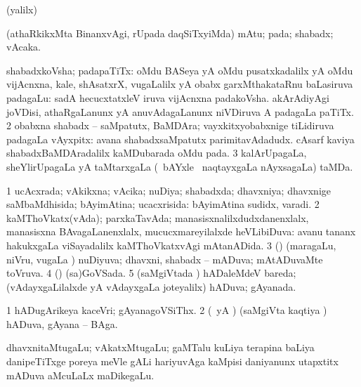 \bentry
{}
\gl{\saMkiSx}
\expl{}
\bmng
 (\UK yalilx) 
\emng
\eentry

\bentry
{} 
\gl{\nA}
\expl{}
\bmng
 (athaRkikxMta BinanxvAgi, rUpada daqSiTxyiMda) mAtu; pada; shabadx; vAcaka. 
\emng
\eentry

\bentry 
{} 
\gl{\nA}
\bmng
\bnum
{} shabadxkoVsha; padapaTiTx: 
\banum
{} oMdu BASeya yA oMdu pusatxkadalilx yA oMdu vijAcnxna, kale, shAsatxrX, \mo vugaLalilx yA obabx garxMthakataRnu baLasiruva padagaLu:  sadA hecucxtatxleV iruva vijAcnxna padakoVsha. 
 akArAdiyAgi joVDisi, athaRgaLanunx yA anuvAdagaLanunx niVDiruva A padagaLa paTiTx. 
\eanum
\numie
\num{2} obabxna shabadx -- saMpatutx, BaMDAra; vayxkitxyobabxnige tiLidiruva padagaLa vAyxpitx:  avana shabadxsaMpatutx parimitavAdadudx.  cAsarf kaviya shabadxBaMDAradalilx kaMDubarada oMdu pada. 
\num{3} kalArUpagaLa, sheYlirUpagaLa yA taMtarxgaLa (\kanmu\ bAYxle \mo\ naqtayxgaLa nAyxsagaLa) taMDa. 
\enum
\emng
\eentry

\bentry
{} 
\gl{\gu}
\expl{}
\bmng
\bnum
\num{1} ucAcxrada; vAkikxna; vAcika; nuDiya; shabadxda; dhavxniya; dhavxnige saMbaMdhisida; bAyimAtina; ucacxrisida:  bAyimAtina sudidx, varadi. 
\num{2} kaMThoVkatx(vAda); parxkaTavAda; manasisxnalilxdudxdanenxlalx, manasisxna BAvagaLanenxlalx, mucucxmareyilalxde heVLibiDuva:  avanu tananx hakukxgaLa viSayadalilx kaMThoVkatxvAgi mAtanADida. 
\num{3} (\kAparx) (maragaLu, niVru, \mo vugaLa \vi) nuDiyuva; dhavxni, shabadx -- mADuva; mAtADuvaMte toVruva. 
\num{4} (\dhavxni) (sa)GoVSada. 
\num{5} (saMgiVtada \vi) hADaleMdeV bareda; (vAdayxgaLilalxde yA vAdayxgaLa joteyalilx) hADuva; gAyanada. 
\enum
\emng
\eentry

\bentry
{} 
\gl{\nA}
\expl{}
\bmng
\bnum
\num{1} hADugArikeya kaceVri; gAyanagoVSiThx. 
\num{2} (\Eva\ yA \bava) (saMgiVta kaqtiya \vi) hADuva, gAyana -- BAga. 
\enum
\emng
\eentry

\bentry 
{} 
\gl{\nA}
\expl{}
\bmng
 dhavxnitaMtugaLu; vAkatxMtugaLu; gaMTalu kuLiya terapina baLiya danipeTiTxge poreya meVle gALi hariyuvAga kaMpisi daniyanunx utapxtitx mADuva aMcuLaLx maDikegaLu. 
\emng
\eentry

